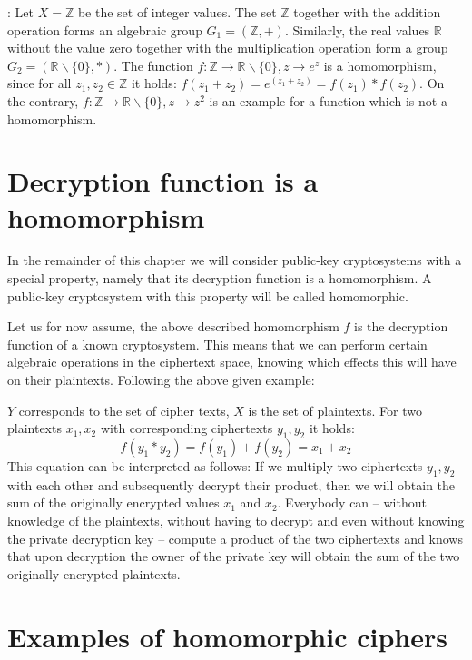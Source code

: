 \begin{example}{:} Let $X = \mathbb{Z}$ be the set of integer values. The set $\mathbb{Z}$ together with the addition operation forms an algebraic group $G_1 = (\mathbb{Z}, +)$. Similarly, the real values $\mathbb{R}$ without the value zero together with the multiplication operation form a group $G_2 = (\mathbb{R}\backslash\{0\}, *)$. The function $f:\mathbb{Z}{\to}\mathbb{R}\backslash\{0\},z {\to}e^z$ is a homomorphism, since for all $z_1,z_2 \in \mathbb{Z}$ it holds: $f(z_1+ z_2) = e^{(z_1+ z_2 )} = f(z_1 )* f(z_2)$. On the contrary, $f:\mathbb{Z} \to \mathbb{R}\backslash\{0\}, z \to z^2$ is an example for a function which is not a homomorphism.
\end{example}

\section{Decryption function is a homomorphism}

In the remainder of this chapter we will consider public-key cryptosystems with a special property, namely that its decryption function is a homomorphism. A public-key cryptosystem with this property will be called homomorphic.

Let us for now assume, the above described homomorphism $f$ is the decryption function of a known cryptosystem. This means that we can perform certain algebraic operations in the ciphertext space, knowing which effects this will have on their plaintexts. Following the above given example:

$Y$ corresponds to the set of cipher texts, $X$ is the set of plaintexts. For two plaintexts $x_1, x_2$ with corresponding ciphertexts $y_1, y_2$ it holds:
%
$$f(y_1  * y_2) = f(y_1) + f(y_2) = x_1  + x_2$$
%
This equation can be interpreted as follows: If we multiply two ciphertexts $y_1, y_2$ with each other and subsequently decrypt their product, then we will obtain the sum of the originally encrypted values $x_1$ and $x_2$. Everybody can -- without knowledge of the plaintexts, without having to decrypt and even without knowing the private decryption key -- compute a product of the two ciphertexts and knows that upon decryption the owner of the private key will obtain the sum of the two originally encrypted plaintexts.

\section{Examples of homomorphic ciphers}

